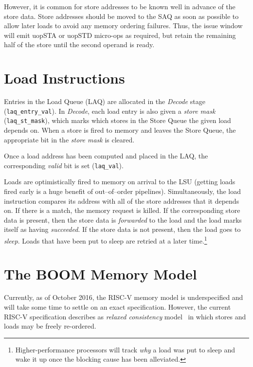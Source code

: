 However, it is common for store addresses to be known well in advance of the store data.  Store addresses should be moved to the SAQ as soon as possible to allow later loads to avoid any memory ordering failures. Thus, the issue window will emit uopSTA or uopSTD micro-ops as required, but retain the remaining half of the store until the second operand is ready.

\section{Load Instructions}

Entries in the Load Queue (LAQ) are allocated in the {\em Decode} stage ({\tt laq\_entry\_val}).  In {\em Decode}, each load entry is also given a {\em store mask} ({\tt laq\_st\_mask}), which marks which stores in the Store Queue the given load depends on.  When a store is fired to memory and leaves the Store Queue, the appropriate bit in the {\em store mask} is cleared.

Once a load address has been computed and placed in the LAQ, the corresponding {\em valid} bit is set ({\tt laq\_val}). 

Loads are optimistically fired to memory on arrival to the LSU (getting loads fired early is a huge benefit of out--of--order pipelines).  Simultaneously, the load instruction compares its address with all of the store addresses that it depends on.  If there is a match, the memory request is killed.  If the corresponding store data is present, then the store data is {\em forwarded} to the load and the load marks itself as having {\em succeeded}.  If the store data is not present, then the load goes to {\em sleep}.  Loads that have been put to sleep are retried at a later time.\footnote{Higher-performance processors will track {\em why} a load was put to sleep and wake it up once the blocking cause has been alleviated.}



\section{The BOOM Memory Model}

Currently, as of October 2016, the RISC-V memory model is underspecified and will take some time to settle on an exact specification. However, the current RISC-V specification describes as {\em relaxed consistency} model~\cite{Gharachorloo:1990:MCE:325096.325102} in which stores and loads may be freely re-ordered. 

